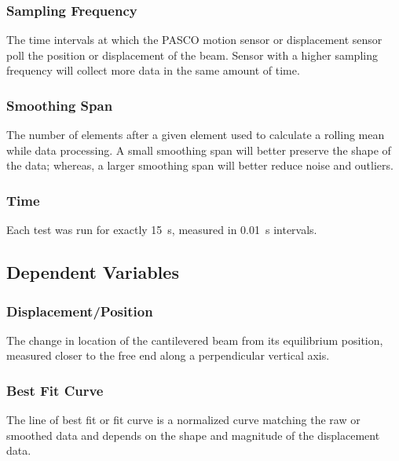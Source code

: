 \documentclass[12 pt]{report}
\begin{document}
\subsubsection{Sampling Frequency} \label{variables-independent_variables-sampling_frequency}
The time intervals at which the PASCO motion sensor or displacement sensor poll the position or displacement of the beam. Sensor with a higher sampling frequency will collect more data in the same amount of time.

\subsubsection{Smoothing Span} \label{variables-independent_variables-smoothing_span}
The number of elements after a given element used to calculate a rolling mean while data processing. A small smoothing span will better preserve the shape of the data; whereas, a larger smoothing span will better reduce noise and outliers.

\subsubsection{Time} \label{variables-independent_variables-time}
Each test was run for exactly \qty{15}{s}, measured in \qty{0.01}{s} intervals.

\subsection{Dependent Variables} \label{variables-dependent_variables}
\subsubsection{Displacement/Position} \label{variables-dependent_variables-displacement-position}
The change in location of the cantilevered beam from its equilibrium position, measured closer to the free end along a perpendicular vertical axis.

\subsubsection{Best Fit Curve} \label{variables-dependent_variablesbest_fit_curve}
The line of best fit or fit curve is a normalized curve matching the raw or smoothed data and depends on the shape and magnitude of the displacement data.
\end{document}

